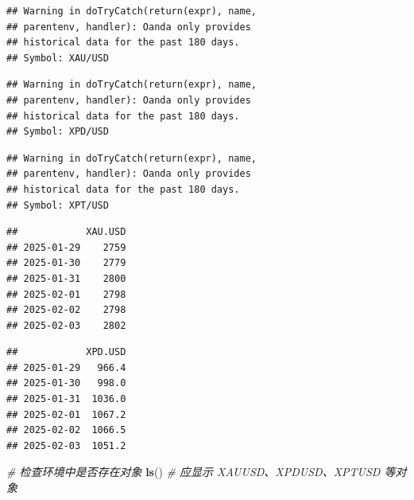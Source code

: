 \documentclass[]{ctexbook}
\newenvironment{Shaded}{\begin{snugshade}}{\end{snugshade}}
\newcommand{\CommentTok}[1]{\textcolor[rgb]{0.56,0.35,0.01}{\textit{#1}}}
\newcommand{\FunctionTok}[1]{\textcolor[rgb]{0.13,0.29,0.53}{\textbf{#1}}}
\newcommand{\NormalTok}[1]{#1}
\newcommand{\OtherTok}[1]{\textcolor[rgb]{0.56,0.35,0.01}{#1}}
\newcommand{\SpecialCharTok}[1]{\textcolor[rgb]{0.81,0.36,0.00}{\textbf{#1}}}
\begin{document}
\begin{verbatim}
## Warning in doTryCatch(return(expr), name,
## parentenv, handler): Oanda only provides
## historical data for the past 180 days.
## Symbol: XAU/USD
\end{verbatim}

\begin{verbatim}
## Warning in doTryCatch(return(expr), name,
## parentenv, handler): Oanda only provides
## historical data for the past 180 days.
## Symbol: XPD/USD
\end{verbatim}

\begin{verbatim}
## Warning in doTryCatch(return(expr), name,
## parentenv, handler): Oanda only provides
## historical data for the past 180 days.
## Symbol: XPT/USD
\end{verbatim}

\begin{Shaded}
\end{Shaded}

\begin{verbatim}
##            XAU.USD
## 2025-01-29    2759
## 2025-01-30    2779
## 2025-01-31    2800
## 2025-02-01    2798
## 2025-02-02    2798
## 2025-02-03    2802
\end{verbatim}

\begin{Shaded}
\end{Shaded}

\begin{verbatim}
##            XPD.USD
## 2025-01-29   966.4
## 2025-01-30   998.0
## 2025-01-31  1036.0
## 2025-02-01  1067.2
## 2025-02-02  1066.5
## 2025-02-03  1051.2
\end{verbatim}

\begin{Shaded}
\begin{Highlighting}[]
\CommentTok{\# 检查环境中是否存在对象}
\FunctionTok{ls}\NormalTok{()  }\CommentTok{\# 应显示 XAUUSD、XPDUSD、XPTUSD 等对象}
\end{Highlighting}
\end{Shaded}
\end{document}
